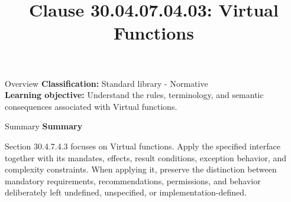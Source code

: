\documentclass[10pt,letterpaper]{article}
\title{Clause 30.04.07.04.03: Virtual Functions}
\author{}
\date{}
\begin{document}
\maketitle
\begin{CornellOverviewBox}{Overview}
\textbf{Classification:} Standard library - Normative\\[2pt]
\textbf{Learning objective:} Understand the rules, terminology, and semantic consequences associated with Virtual functions.
\end{CornellOverviewBox}\begin{CornellSummaryBox}{Summary}
{\sffamily\bfseries\color{Accent} Summary}\par\vspace{3pt}Section 30.4.7.4.3 focuses on Virtual functions. Apply the specified interface together with its mandates, effects, result conditions, exception behavior, and complexity constraints. When applying it, preserve the distinction between mandatory requirements, recommendations, permissions, and behavior deliberately left undefined, unspecified, or implementation-defined.
\end{CornellSummaryBox}
\end{document}
